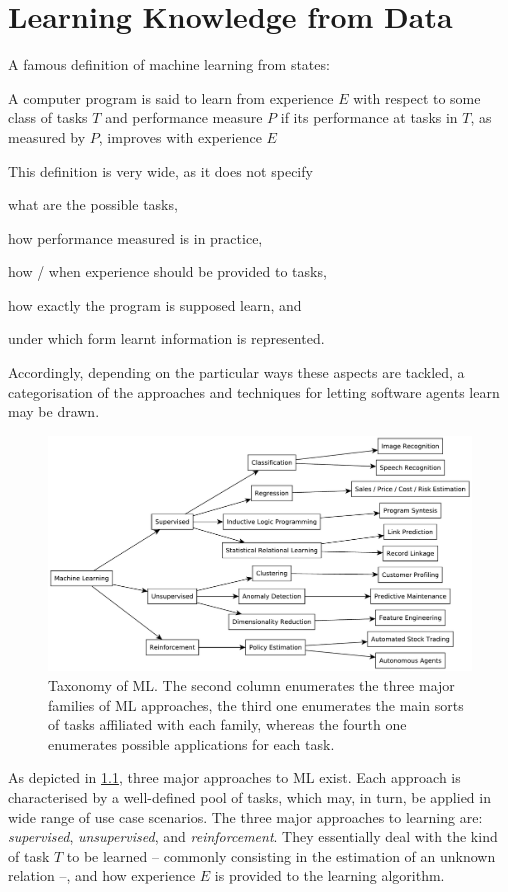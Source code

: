 \documentclass[12pt,a4paper,openright,twoside]{book}
\begin{document}
\chapter{Learning Knowledge from Data}\label{chap:learning}

A famous definition of machine learning from \cite{Mitchell1997} states:
%
\begin{displayquote}
    A computer program is said to learn from experience $E$ with respect to some class of tasks $T$ and performance measure $P$ if its performance at tasks in $T$, as measured by $P$, improves with experience $E$
\end{displayquote}
%
This definition is very wide, as it does not specify
%
\begin{inlinelist}
    \item what are the possible tasks,
    \item how performance measured is in practice,
    \item how / when experience should be provided to tasks,
    \item how exactly the program is supposed learn, and
    \item under which form learnt information is represented.
\end{inlinelist}
%
Accordingly, depending on the particular ways these aspects are tackled, a categorisation of the approaches and techniques for letting software agents learn may be drawn.

\begin{figure}
    \centering
    \includegraphics[width=.8\linewidth]{figures/ml-taxonomy.pdf}
    \caption[Taxonomy of ML]{Taxonomy of ML. The second column enumerates the three major families of ML approaches, the third one enumerates the main sorts of tasks affiliated with each family, whereas the fourth one enumerates possible applications for each task.}
    \label{fig:ml-taxonomy}
\end{figure}
%
As depicted in \cref{fig:ml-taxonomy}, three major approaches to ML exist.
%
Each approach is characterised by a well-defined pool of tasks, which may, in turn, be applied in wide range of use case scenarios.
%
The three major approaches to learning are: \emph{supervised}, \emph{unsupervised}, and \emph{reinforcement}.
%
They essentially deal with the kind of task $T$ to be learned -- commonly consisting in the estimation of an unknown relation --, and how experience $E$ is provided to the learning algorithm.
\end{document}
